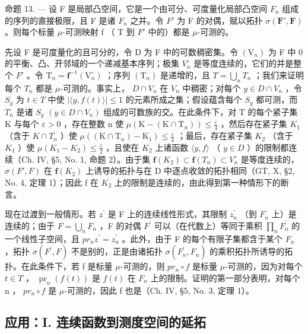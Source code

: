 命题 13. --- 设 F 是局部凸空间，它是一个由可分、可度量化局部凸空间 \(F_{n}\) 组成的序列的直接极限，且 F 是诸 \(F_{n}\) 之并。令 \(F'\) 为 F 的对偶，赋以拓扑 \(\sigma(\mathbf{F}',\mathbf{F})\) 。则每个标量 \(\mu\)-可测映射 f （ T 到 \(F'\) 中的）都是 \(\mu\)-可测的。

先设 F 是可度量化的且可分的，令 D 为 F 中的可数稠密集。令 \((\mathrm{V}_{n})\) 为 F 中 0 的平衡、凸、开邻域的一个递减基本序列；极集 \(V_{n}^{\circ}\) 是等度连续的，它们的并是整个 \(F'\) 。令 \(\mathrm{T}_{n} = \mathbf{f}^{-1}(\mathrm{V}_{n}^{\circ})\) ；序列 \((\mathrm{T}_{n})\) 是递增的，且 \(T = \bigcup_{n} T_{n}\) ；我们来证明每个 \(T_{n}\) 都是 \(\mu\)-可测的。事实上， \(D \cap V_{n}\) 在 \(V_{n}\) 中稠密；对每个 \(y \in D \cap V_{n}\) ，令 \(S_{y}\) 为 \(t \in T\) 中使 \(|\langle y, f(t) \rangle| \leqslant 1\) 的元素所成之集；假设蕴含每个 \(S_{y}\) 都可测，而 \(T_{n}\) 是诸 \(S_{y}\) \((y \in D \cap V_{n})\) 组成的可数族的交。在此条件下，对 T 的每个紧子集 K 与每个 \(\varepsilon > 0\) ，存在整数 n 使 \(\mu\left(\mathrm{K}-\left(\mathrm{K}\cap\mathrm{T}_{n}\right)\right)\leqslant\frac{\varepsilon}{4}\) ，然后存在紧子集 \(K_{1}\) （含于 \(K\cap T_{n}\) ）使 \(\mu\left(\left(\mathrm{K}\cap\mathrm{T}_{n}\right)-\mathrm{K}_{1}\right)\leqslant\frac{\varepsilon}{4}\) ；最后，存在紧子集 \(K_{2}\) （含于 \(K_{1}\) ）使 \(\mu(K_{1}-K_{2})\leqslant\frac{\varepsilon}{2}\) ，且使在 \(K_{2}\) 上诸函数 \(\langle y,f\rangle\) （ \(y\in D\) ）的限制都连续（Ch. IV, §5, No. 1, 命题 2）。由于集 \(\mathbf{f}(K_{2})\subset\mathbf{f}(T_{n})\subset V_{n}^{\circ}\) 是等度连续的， \(\sigma(F',F)\) 在 \(\mathbf{f}(K_{2})\) 上诱导的拓扑与在 D 中逐点收敛的拓扑相同（GT, X, §2, No. 4, 定理 1）；因此 f 在 \(K_{2}\) 上的限制是连续的，由此得到第一种情形下的断言。

现在过渡到一般情形。若 \(z^{\prime}\) 是 F 上的连续线性形式，其限制 \(z_{n}^{\prime}\) （到 \(F_{n}\) 上）是连续的；由于 \(F = \bigcup_{n} F_{n}\) ，F 的对偶 \(F^{\prime}\) 可以（在代数上）等同于乘积 \(\prod_{n} F_{n}^{\prime}\) 的一个线性子空间，且 \(pr_{n}z^{\prime} = z_{n}^{\prime}\) 。此外，由于 F 的每个有限子集都含于某个 \(F_{n}\) ，拓扑 \(\sigma(F^{\prime}, F)\) 不是别的，正是由诸拓扑 \(\sigma(F_{n}^{\prime}, F_{n})\) 的乘积拓扑所诱导的拓扑。在此条件下，若 f 是标量 \(\mu\)-可测的，则 \(pr_{n} \circ f\) 是标量 \(\mu\)-可测的，因为对每个 \(t \in T\) ， \(\operatorname{pr}_{n}(f(t))\) 是 \(f(t)\) 在 \(F_{n}\) 上的限制。证明的第一部分表明，对每个 n ， \(pr_{n} \circ f\) 是 \(\mu\)-可测的，因此 f 也是（Ch. IV, §5, No. 3, 定理 1）。

\subsection{应用：I. 连续函数到测度空间的延拓}

